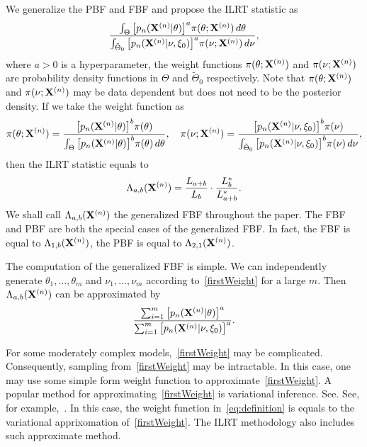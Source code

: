 \documentclass[11pt]{article}
\theoremstyle{plain}
\theoremstyle{definition}
\theoremstyle{remark}
\begin{document}
We generalize the PBF and FBF and propose the ILRT statistic as
\begin{equation}\label{eq:definition}
    \frac{\int_{\Theta} \big[p_n(\mathbf{X}^{(n)}|\theta)\big]^{a}\pi(\theta;\mathbf{X}^{(n)})\,d\theta}{\int_{\tilde{\Theta}_0} \big[p_n(\mathbf{X}^{(n)}|\nu,\xi_0)\big]^{a}\pi(\nu;\mathbf{X}^{(n)})\,d\nu},
\end{equation}
where $a>0$ is a hyperparameter,
 the weight functions $\pi(\theta;\mathbf{X}^{(n)})$ and $\pi(\nu;\mathbf{X}^{(n)})$ are probability density functions in $\Theta$ and $\tilde{\Theta}_0$ respectively.
Note that $\pi(\theta;\mathbf{X}^{(n)})$ and $\pi(\nu;\mathbf{X}^{(n)})$ may be data dependent but does not need to be the posterior density.
If we take the weight function as
\begin{equation}\label{firstWeight}
\pi(\theta;\mathbf{X}^{(n)})=\frac{\big[p_n(\mathbf{X}^{(n)}|\theta)\big]^b \pi(\theta)}{\int_{\Theta}\big[p_n(\mathbf{X}^{(n)}|\theta)\big]^b \pi(\theta)\, d\theta},
\quad
\pi(\nu;\mathbf{X}^{(n)})=\frac{\big[p_n(\mathbf{X}^{(n)}|\nu,
    \xi_0)\big]^b \pi(\nu)}{\int_{\tilde{\Theta}_0}\big[p_n(\mathbf{X}^{(n)}|\nu,\xi_0)\big]^b \pi(\nu)\, d\nu},
\end{equation}
then the ILRT statistic equals to
$$
    \Lambda_{a,b}(\mathbf{X}^{(n)})=
    \frac{L_{a+b}}{L_{b}}\cdot \frac{L_{b}^*}{L_{a+b}^*}.
$$
We shall call $\Lambda_{a,b}(\mathbf{X}^{(n)})$ the generalized FBF throughout the paper.
The FBF and PBF are both the special cases of the generalized FBF.
In fact, the FBF is equal to $\Lambda_{1,b}(\mathbf{X}^{(n)})$, the PBF is equal to $\Lambda_{2,1}(\mathbf{X}^{(n)})$.

The computation of the generalized FBF is simple.
We can independently generate $\theta_1,\ldots,\theta_m$ and $\nu_1,\ldots,\nu_m$ according to~\eqref{firstWeight}  for a large $m$.
Then $\Lambda_{a,b}(\mathbf{X}^{(n)})$ can be approximated by
\begin{equation*}
    \frac{\sum_{i=1}^m \big[p_n(\mathbf{X}^{(n)}|\theta)\big]^{a}}{\sum_{i=1}^m\big[p_n(\mathbf{X}^{(n)}|\nu,\xi_0)\big]^{a}}.
\end{equation*}


For some moderately complex models,~\eqref{firstWeight} may be complicated.
Consequently, sampling from~\eqref{firstWeight} may be intractable.
In this case, one may use some simple form weight function to approximate~\eqref{firstWeight}.
A popular method for approximating~\eqref{firstWeight} is variational inference.
See. See, for example,~\cite{blei2017}.
In this case, the weight function in~\eqref{eq:definition} is equals to the variational apprixomation of~\eqref{firstWeight}.
The ILRT methodology also includes such approximate method.
\end{document}
